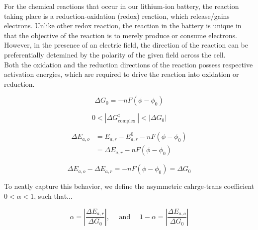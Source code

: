 \documentclass[lettersize,journal]{IEEEtran}
\begin{document}
For the chemical reactions that occur in our lithium-ion battery, the reaction taking place is a reduction-oxidation (redox) reaction, which release/gains electrons. Unlike other redox reaction, the reaction in the battery is unique in that the objective of the reaction is to merely produce or consume electrons. However, in the presence of an electric field, the direction of the reaction can be preferentially detemined by the polarity of the given field across the cell. \\

Both the oxidation and the reduction directions of the reaction possess respective activation energies, which are required to drive the reaction into oxidation or reduction.



%

\begin{equation}
\Delta G_{0}=-n F\left(\phi-\phi_{0}\right)
\end{equation}

\begin{equation}
0<\left|\Delta G_{\text {complex }}^{\ddagger}\right|<\left|\Delta G_{0}\right|
\end{equation}

\begin{equation}
\begin{aligned}
\Delta E_{a, o} &=E_{a, r}-E_{a, r}^{0}-n F\left(\phi-\phi_{0}\right) \\
&=\Delta E_{a, r}-n F\left(\phi-\phi_{0}\right)
\end{aligned}
\end{equation}

\begin{equation}
\Delta E_{a, o}-\Delta E_{a, r}=-n F\left(\phi-\phi_{0}\right)=\Delta G_{0}
\end{equation}

\noindent To neatly capture this behavior, we define the asymmetric cahrge-trans coefficient $0 < \alpha < 1$, such that...

\begin{equation}
\alpha=\left|\frac{\Delta E_{a, r}}{\Delta G_{0}}\right|, \quad \text { and } \quad 1-\alpha=\left|\frac{\Delta E_{a, o}}{\Delta G_{0}}\right|
\end{equation}
\end{document}
